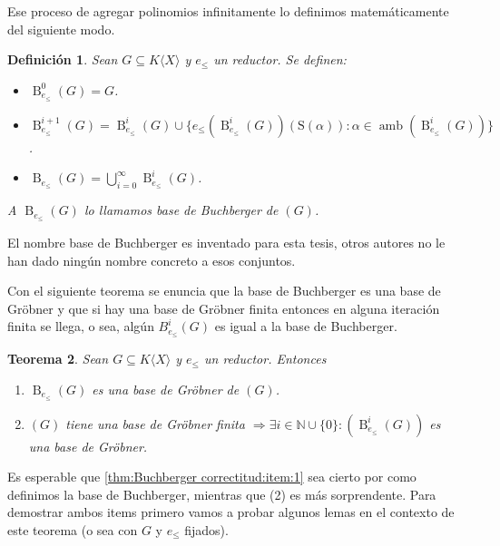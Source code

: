 \documentclass[12pt]{report}
\theoremstyle{customstyle}
\newtheorem{theorem}{Teorema}[chapter]
\newtheorem{definition}[theorem]{Definición}
\theoremstyle{factstyle}
\DeclareMathOperator{\amb}{amb}
\renewcommand{\S}{\text{S}}
\DeclareMathOperator{\B}{B}
\begin{document}
Ese proceso de agregar polinomios infinitamente lo definimos matemáticamente del siguiente modo.

\begin{definition}
  Sean $G ⊆ K⟨X⟩$ y $e_≤$ un reductor. Se definen:
  \begin{itemize}
    \item $\B_{e_≤}^0(G) = G$.
    \item $\B_{e_≤}^{i + 1}(G) = \B_{e_≤}^i(G) ∪ \{e_≤(\B_{e_≤}^i(G))(\S(α)) : α ∈ \amb(\B_{e_≤}^i(G))\}$.
    \item $\B_{e_≤}(G) = ⋃_{i = 0}^∞ \B_{e_≤}^i(G)$.
  \end{itemize}
  A $\B_{e_≤}(G)$ lo llamamos base de Buchberger de $(G)$.
\end{definition}

El nombre base de Buchberger es inventado para esta tesis, otros autores no le han dado ningún nombre concreto a esos conjuntos.

Con el siguiente teorema se enuncia que la base de Buchberger es una base de Gröbner y que si hay una base de Gröbner finita entonces en alguna iteración finita se llega, o sea, algún $B_{e_≤}^{i}(G)$ es igual a la base de Buchberger.

\begin{theorem}\label{thm:Buchberger correctitud}
  Sean $G ⊆ K⟨X⟩$ y $e_≤$ un reductor. Entonces
  \begin{enumerate}
    \item $\B_{e_≤}(G)$ es una base de Gröbner de $(G)$.\label{thm:Buchberger correctitud:item:1} %
    \item $(G)$ tiene una base de Gröbner finita $⇒ ∃i ∈ ℕ ∪ \{0\} : (\B_{e_≤}^i(G))$ es una base de Gröbner.
  \end{enumerate}
\end{theorem}

Es esperable que \ref{thm:Buchberger correctitud:item:1} sea cierto por como definimos la base de Buchberger, mientras que (2) es más sorprendente. Para demostrar ambos items primero vamos a probar algunos lemas en el contexto de este teorema (o sea con $G$ y $e_≤$ fijados).
\end{document}

